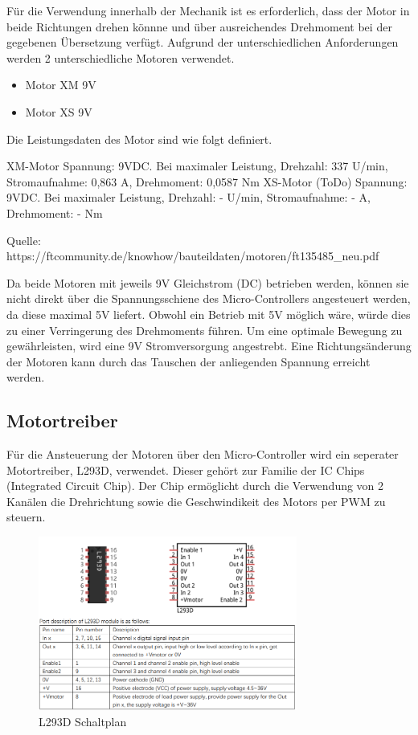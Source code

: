 \documentclass[conference,compsoc,final,a4paper]{IEEEtran}
\begin{document}
Für die Verwendung innerhalb der Mechanik ist es erforderlich, dass der Motor in beide Richtungen drehen könnne und über ausreichendes Drehmoment bei der gegebenen Übersetzung verfügt.
Aufgrund der unterschiedlichen Anforderungen werden 2 unterschiedliche Motoren verwendet.
\begin{itemize}
\item Motor XM 9V
\item Motor XS 9V
\end{itemize}

Die Leistungsdaten des Motor sind wie folgt definiert.

XM-Motor
Spannung: 9VDC. Bei maximaler Leistung, Drehzahl: 337 U/min, Stromaufnahme: 0,863 A, Drehmoment: 0,0587 Nm
XS-Motor (ToDo)
Spannung: 9VDC. Bei maximaler Leistung, Drehzahl: - U/min, Stromaufnahme: - A, Drehmoment: - Nm

Quelle: https://ftcommunity.de/knowhow/bauteildaten/motoren/ft135485_neu.pdf

Da beide Motoren mit jeweils 9V Gleichstrom (DC) betrieben werden, können sie nicht direkt über die Spannungsschiene des Micro-Controllers angesteuert werden, 
da diese maximal 5V liefert. Obwohl ein Betrieb mit 5V möglich wäre, würde dies zu einer Verringerung des Drehmoments führen. Um eine optimale Bewegung zu gewährleisten, 
wird eine 9V Stromversorgung angestrebt.  Eine Richtungsänderung der Motoren kann durch das Tauschen der anliegenden Spannung erreicht werden.  

\subsection{Motortreiber}

Für die Ansteuerung der Motoren über den Micro-Controller wird ein seperater Motortreiber, L293D, verwendet.
Dieser gehört zur Familie der IC Chips (Integrated Circuit Chip). Der Chip ermöglicht durch die Verwendung von 2 Kanälen die Drehrichtung 
sowie die Geschwindikeit des Motors per PWM zu steuern.

\begin{figure}[h]
  \centering
\includegraphics[width=8.5cm]{../images/L293D.png}
\caption{L293D Schaltplan}
\label{Elektrik:L293D}
\end{figure}
\end{document}
